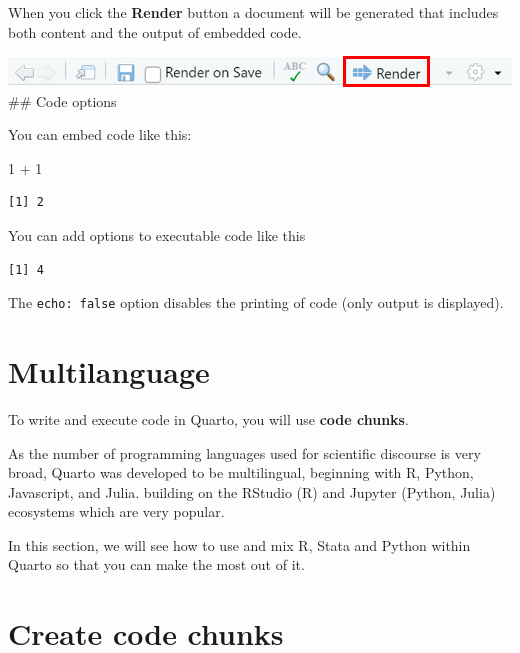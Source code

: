 \documentclass[
  letterpaper,
  DIV=11,
  numbers=noendperiod,
  oneside]{scrreprt}
\newenvironment{Shaded}{\begin{snugshade}}{\end{snugshade}}
\newcommand{\DecValTok}[1]{\textcolor[rgb]{0.68,0.00,0.00}{#1}}
\newcommand{\SpecialCharTok}[1]{\textcolor[rgb]{0.37,0.37,0.37}{#1}}
\begin{document}
When you click the \textbf{Render} button a document will be generated
that includes both content and the output of embedded code.

\includegraphics{images/paste-A8386DC4.png} \#\# Code options

You can embed code like this:

\begin{Shaded}
\begin{Highlighting}[]
\DecValTok{1} \SpecialCharTok{+} \DecValTok{1}
\end{Highlighting}
\end{Shaded}

\begin{verbatim}
[1] 2
\end{verbatim}

You can add options to executable code like this

\begin{verbatim}
[1] 4
\end{verbatim}

The \texttt{echo:\ false} option disables the printing of code (only
output is displayed).

\hypertarget{multilanguage}{%
\section{Multilanguage}\label{multilanguage}}

To write and execute code in Quarto, you will use \textbf{code chunks}.

As the number of programming languages used for scientific discourse is
very broad, Quarto was developed to be multilingual, beginning with R,
Python, Javascript, and Julia. building on the RStudio (R) and Jupyter
(Python, Julia) ecosystems which are very popular.

In this section, we will see how to use and mix R, Stata and Python
within Quarto so that you can make the most out of it.

\hypertarget{create-code-chunks}{%
\section{Create code chunks}\label{create-code-chunks}}
\end{document}
